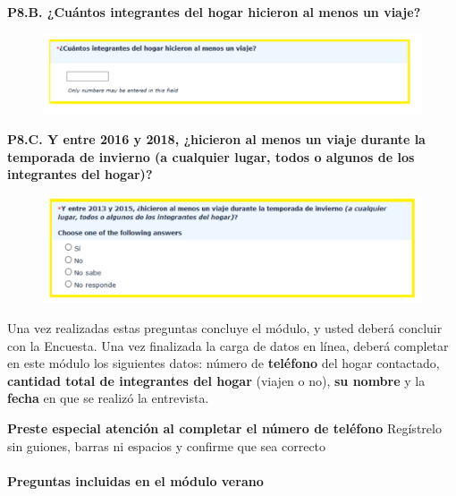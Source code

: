 \documentclass[
  openany]{book}
\begin{document}
\textbf{P8.B. ¿Cuántos integrantes del hogar hicieron al menos un viaje?}

\begin{figure}

{\centering \includegraphics[width=1\linewidth]{imagenes/figura6-136} 

}

\end{figure}

\textbf{P8.C. Y entre 2016 y 2018, ¿hicieron al menos un viaje durante la temporada de invierno (a cualquier lugar, todos o algunos de los integrantes del hogar)?}

\begin{figure}

{\centering \includegraphics[width=1\linewidth]{imagenes/figura6-137} 

}

\end{figure}

Una vez realizadas estas preguntas concluye el módulo, y usted deberá concluir con la Encuesta. Una vez finalizada la carga de datos en línea, deberá completar en este módulo los siguientes datos: número de \textbf{teléfono} del hogar contactado, \textbf{cantidad total de integrantes del hogar} (viajen o no), \textbf{su nombre} y la \textbf{fecha} en que se realizó la entrevista.

\textbf{Preste especial atención al completar el número de teléfono} Regístrelo sin guiones, barras ni espacios y confirme que sea correcto

\hypertarget{preguntas-incluidas-en-el-muxf3dulo-verano}{%
\paragraph{Preguntas incluidas en el módulo verano}\label{preguntas-incluidas-en-el-muxf3dulo-verano}}
\end{document}
